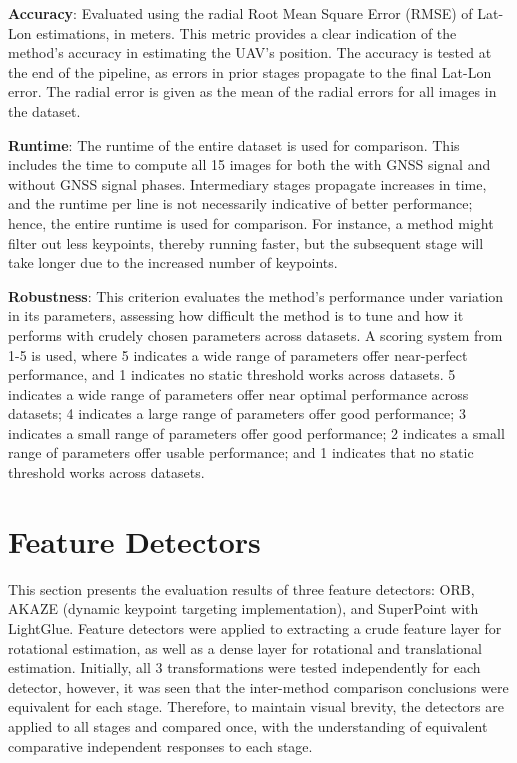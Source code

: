 \textbf{Accuracy}: Evaluated using the radial Root Mean Square Error (RMSE) of Lat-Lon estimations, in meters. This metric provides a clear indication of the method's accuracy in estimating the UAV's position. The accuracy is tested at the end of the pipeline, as errors in prior stages propagate to the final Lat-Lon error. The radial error is given as the mean of the radial errors for all images in the dataset.

\textbf{Runtime}: The runtime of the entire dataset is used for comparison. This includes the time to compute all 15 images for both the with GNSS signal and without GNSS signal phases. Intermediary stages propagate increases in time, and the runtime per line is not necessarily indicative of better performance; hence, the entire runtime is used for comparison. For instance, a method might filter out less keypoints, thereby running faster, but the subsequent stage will take longer due to the increased number of keypoints.

\textbf{Robustness}: This criterion evaluates the method's performance under variation in its parameters, assessing how difficult the method is to tune and how it performs with crudely chosen parameters across datasets. A scoring system from 1-5 is used, where 5 indicates a wide range of parameters offer near-perfect performance, and 1 indicates no static threshold works across datasets. 5 indicates a wide range of parameters offer near optimal performance across datasets; 4 indicates a large range of parameters offer good performance; 3 indicates a small range of parameters offer good performance; 2 indicates a small range of parameters offer usable performance; and 1 indicates that no static threshold works across datasets.


\vspace{-0.5cm}


\section{Feature Detectors}
\vspace{-0.25cm}


This section presents the evaluation results of three feature detectors: ORB, AKAZE (dynamic keypoint targeting implementation), and SuperPoint with LightGlue. Feature detectors were applied to extracting a crude feature layer for rotational estimation, as well as a dense layer for rotational and translational estimation. Initially, all 3 transformations were tested independently for each detector, however, it was seen that the inter-method comparison conclusions were equivalent for each stage. Therefore, to maintain visual brevity, the detectors are applied to all stages and compared once, with the understanding of equivalent comparative independent responses to each stage.

